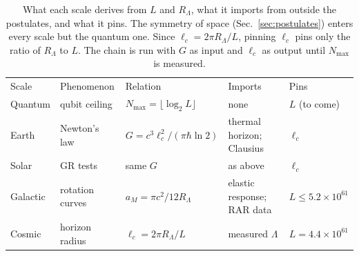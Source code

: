 \documentclass[aps,prd,twocolumn,superscriptaddress,nofootinbib,showkeys]{revtex4-2}
\newcommand{\lc}{\ell_c}
\newcommand{\RL}{R_\Lambda}
\begin{document}
\begin{table}[t]
\caption{What each scale derives from $L$ and $\RL$, what it imports from outside the postulates, and what it pins. The symmetry of space (Sec.~\ref{sec:postulates}) enters every scale but the quantum one. Since $\lc = 2\pi\RL/L$, pinning $\lc$ pins only the ratio of $\RL$ to $L$. The chain is run with $G$ as input and $\lc$ as output until $N_{\max}$ is measured.}
\label{tab:pins}
\begin{ruledtabular}
\small\setlength{\tabcolsep}{4pt}
\begin{tabular}{lllll}
Scale & Phenomenon & Relation & Imports & Pins \\
\colrule
Quantum & qubit ceiling & $N_{\max}=\lfloor\log_2L\rfloor$ & none & $L$ (to come) \\
Earth & Newton's law & $G=c^3\lc^2/(\pi\hbar\ln2)$ & thermal horizon; Clausius & $\lc$ \\
Solar & GR tests & same $G$ & as above & $\lc$ \\
Galactic & rotation curves & $a_M=\pi c^2/12\RL$ & elastic response; RAR data & $L\le5.2\!\times\!10^{61}$ \\
Cosmic & horizon radius & $\lc=2\pi\RL/L$ & measured $\Lambda$ & $L=4.4\!\times\!10^{61}$ \\
\end{tabular}
\end{ruledtabular}
\end{table}
\end{document}
